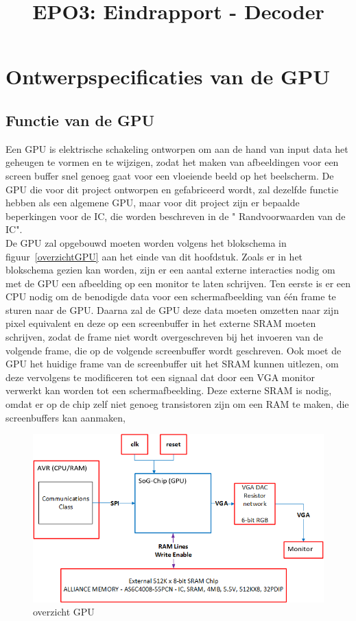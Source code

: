 \documentclass{scrartcl} %
\author{}
\title{EPO3: Eindrapport - Decoder}
\begin{document}
\chapter{Ontwerpspecificaties van de GPU}
\label{ch:spec}

\section {Functie van de GPU}
Een GPU is elektrische schakeling ontworpen om aan de hand van input data het geheugen te vormen en te wijzigen, zodat het maken van afbeeldingen voor een screen buffer snel genoeg gaat voor een vloeiende beeld op het beelscherm. De GPU die voor  dit project ontworpen en gefabriceerd wordt, zal dezelfde functie hebben als een algemene GPU, maar voor dit project zijn er bepaalde beperkingen voor de IC, die worden beschreven in de " Randvoorwaarden van de IC".
\\De GPU zal opgebouwd moeten worden volgens het blokschema in figuur~\ref{overzichtGPU} aan het einde van dit hoofdstuk.
Zoals er in het blokschema gezien kan worden, zijn er een aantal externe interacties nodig om met de GPU een afbeelding op een monitor te laten schrijven. Ten eerste is er een CPU nodig om de benodigde data voor een schermafbeelding van één frame te sturen naar de GPU. Daarna zal de GPU deze data moeten omzetten naar zijn pixel equivalent en deze op een screenbuffer in het externe SRAM moeten schrijven, zodat de frame niet wordt overgeschreven bij het invoeren van de volgende frame, die op de volgende screenbuffer wordt geschreven. Ook moet de GPU het huidige frame van de screenbuffer uit het SRAM kunnen uitlezen, om deze vervolgens te modificeren tot een signaal dat door een VGA monitor verwerkt kan worden tot een schermafbeelding. Deze externe SRAM is nodig, omdat er op de chip zelf niet genoeg transistoren zijn om een RAM te maken, die screenbuffers kan aanmaken,
\begin{figure}[H]
\centering
        \includegraphics[scale=0.9]{Resource/system_overview.png}
        \caption{overzicht GPU}
        \label{fig:overzichtGPU}
\end{figure} 
\end{document}
